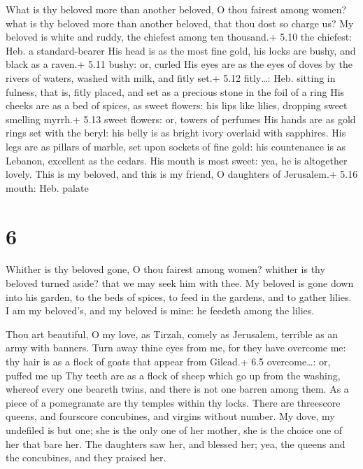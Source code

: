  What is thy beloved more than another beloved, O thou
fairest among women? what is thy beloved more than another beloved, that
thou dost so charge us?  My beloved is white and ruddy, the
chiefest among ten thousand.+ 5.10 the chiefest: Heb. a standard-bearer
 His head is as the most fine gold, his locks are bushy,
and black as a raven.+ 5.11 bushy: or, curled  His eyes are
as the eyes of doves by the rivers of waters, washed with milk, and
fitly set.+ 5.12 fitly\ldots: Heb. sitting in fulness, that is, fitly
placed, and set as a precious stone in the foil of a ring 
His cheeks are as a bed of spices, as sweet flowers: his lips like
lilies, dropping sweet smelling myrrh.+ 5.13 sweet flowers: or, towers
of perfumes  His hands are as gold rings set with the
beryl: his belly is as bright ivory overlaid with sapphires.
 His legs are as pillars of marble, set upon sockets of
fine gold: his countenance is as Lebanon, excellent as the cedars.
 His mouth is most sweet: yea, he is altogether lovely.
This is my beloved, and this is my friend, O daughters of Jerusalem.+
5.16 mouth: Heb. palate

\hypertarget{section-5}{%
\section{6}\label{section-5}}

 Whither is thy beloved gone, O thou fairest among women?
whither is thy beloved turned aside? that we may seek him with thee.
 My beloved is gone down into his garden, to the beds of
spices, to feed in the gardens, and to gather lilies.  I am
my beloved's, and my beloved is mine: he feedeth among the lilies.

 Thou art beautiful, O my love, as Tirzah, comely as
Jerusalem, terrible as an army with banners.  Turn away
thine eyes from me, for they have overcome me: thy hair is as a flock of
goats that appear from Gilead.+ 6.5 overcome\ldots: or, puffed me up
 Thy teeth are as a flock of sheep which go up from the
washing, whereof every one beareth twins, and there is not one barren
among them.  As a piece of a pomegranate are thy temples
within thy locks.  There are threescore queens, and
fourscore concubines, and virgins without number.  My dove,
my undefiled is but one; she is the only one of her mother, she is the
choice one of her that bare her. The daughters saw her, and blessed her;
yea, the queens and the concubines, and they praised her.

